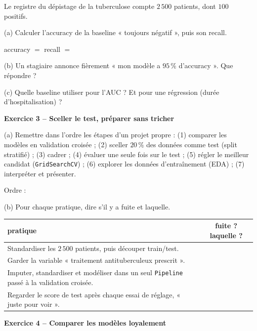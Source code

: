\documentclass[10pt,a4paper]{article}
\newcommand{\repligne}{\par\vspace{0.42cm}\noindent\dotfill}
\newcommand{\zonecalcul}[1]{\par\vspace{0.15cm}\noindent{\small\emph{Espace de calcul :}}\par\vspace{#1}}
\begin{document}
Le registre du dépistage de la tuberculose compte $2\,500$ patients, dont $100$ positifs.

\vspace{0.15cm}
(a) Calculer l'accuracy de la baseline « toujours négatif », puis son recall.
\zonecalcul{0.7cm}
accuracy $=$ \makebox[2cm]{\dotfill} \quad recall $=$ \makebox[2cm]{\dotfill}

\vspace{0.15cm}
(b) Un stagiaire annonce fièrement « mon modèle a $95\,\%$ d'accuracy ». Que répondre ?
\repligne\repligne

\vspace{0.15cm}
(c) Quelle baseline utiliser pour l'AUC ? Et pour une régression (durée d'hospitalisation) ?
\repligne\repligne

\vspace{0.45cm}
\textbf{\large Exercice 3 -- Sceller le test, préparer sans tricher}
\vspace{0.15cm}

(a) Remettre dans l'ordre les étapes d'un projet propre : (1) comparer les modèles en validation croisée ; (2) sceller $20\,\%$ des données comme test (split stratifié) ; (3) cadrer ; (4) évaluer une seule fois sur le test ; (5) régler le meilleur candidat (\texttt{GridSearchCV}) ; (6) explorer les données d'entraînement (EDA) ; (7) interpréter et présenter.

\vspace{0.15cm}
Ordre : \makebox[6cm]{\dotfill}

\vspace{0.2cm}
(b) Pour chaque pratique, dire s'il y a fuite et laquelle.

\vspace{0.1cm}
{\small \renewcommand{\arraystretch}{1.8}\begin{tabular}{|p{11.6cm}|c|}\hline
pratique & fuite ? laquelle ?\\\hline
Standardiser les $2\,500$ patients, puis découper train/test. & \\\hline
Garder la variable « traitement antituberculeux prescrit ». & \\\hline
Imputer, standardiser et modéliser dans un seul \texttt{Pipeline} passé à la validation croisée. & \\\hline
Regarder le score de test après chaque essai de réglage, « juste pour voir ». & \\\hline
\end{tabular}}

\vspace{0.45cm}
\textbf{\large Exercice 4 -- Comparer les modèles loyalement}
\vspace{0.15cm}
\end{document}
